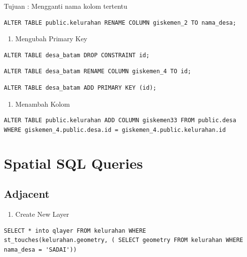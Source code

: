 \documentclass[]{book}
\providecommand{\tightlist}{%
  \setlength{\itemsep}{0pt}\setlength{\parskip}{0pt}}
\begin{document}
Tujuan : Mengganti nama kolom tertentu

\begin{verbatim}
ALTER TABLE public.kelurahan RENAME COLUMN giskemen_2 TO nama_desa;
\end{verbatim}

\begin{enumerate}
\def\labelenumi{\arabic{enumi}.}
\setcounter{enumi}{2}
\tightlist
\item
  Mengubah Primary Key
\end{enumerate}

\begin{verbatim}
ALTER TABLE desa_batam DROP CONSTRAINT id;
\end{verbatim}

\begin{verbatim}
ALTER TABLE desa_batam RENAME COLUMN giskemen_4 TO id;
\end{verbatim}

\begin{verbatim}
ALTER TABLE desa_batam ADD PRIMARY KEY (id);
\end{verbatim}

\begin{enumerate}
\def\labelenumi{\arabic{enumi}.}
\setcounter{enumi}{3}
\tightlist
\item
  Menambah Kolom
\end{enumerate}

\begin{verbatim}
ALTER TABLE public.kelurahan ADD COLUMN giskemen33 FROM public.desa WHERE giskemen_4.public.desa.id = giskemen_4.public.kelurahan.id
\end{verbatim}

\hypertarget{spatial-sql-queries}{%
\section{Spatial SQL Queries}\label{spatial-sql-queries}}

\hypertarget{adjacent}{%
\subsection{Adjacent}\label{adjacent}}

\begin{enumerate}
\def\labelenumi{\arabic{enumi}.}
\tightlist
\item
  Create New Layer
\end{enumerate}

\begin{verbatim}
SELECT * into qlayer FROM kelurahan WHERE st_touches(kelurahan.geometry, ( SELECT geometry FROM kelurahan WHERE nama_desa = 'SADAI'))
\end{verbatim}
\end{document}
